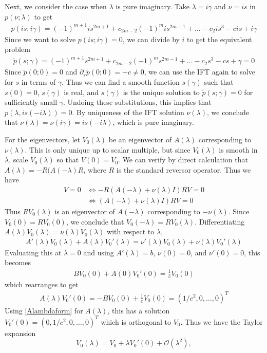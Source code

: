 \documentclass[thesis.tex]{subfiles}
\begin{document}
Next, we consider the case when $\lambda$ is pure imaginary. Take $\lambda = i \gamma$ and $\nu = i s$ in $p(\nu; \lambda)$ to get
\begin{align*}
p(i s; i \gamma) = (-1)^{m+1} i s^{2m+1} + c_{2m-2} (-1)^m i s^{2m-1} + \dots - c_2 i s^3 - c i s + i \gamma
\end{align*}
Since we want to solve $p(i s; i \gamma) = 0$, we can divide by $i$ to get the equivalent problem
\begin{align*}
\tilde{p}(s; \gamma) = (-1)^{m+1} s^{2m+1} + c_{2m-2} (-1)^m s^{2m-1} + \dots - c_2 s^3 - c s + \gamma = 0
\end{align*}
Since $\tilde{p}(0; 0) = 0$ and $\partial_s \tilde{p}(0; 0) = -c \neq 0$, we can use the IFT again to solve for $s$ in terms of $\gamma$. Thus we can find a smooth function $s(\gamma)$ such that $s(0) = 0$, $s(\gamma)$ is real, and $s(\gamma)$ is the unique solution to $\tilde{p}(s; \gamma) = 0$ for sufficiently small $\gamma$. Undoing these substitutions, this implies that $p(\lambda, i s(-i \lambda)) = 0$. By uniqueness of the IFT solution $\nu(\lambda)$, we conclude that $\nu(\lambda) = \nu(i \gamma) = i s(-i \lambda)$, which is pure imaginary.

For the eigenvectors, let $V_0(\lambda)$ be an eigenvector of $A(\lambda)$ corresponding to $\nu(\lambda)$. This is only unique up to scalar multiple, but since $V_0(\lambda)$ is smooth in $\lambda$, scale $V_0(\lambda)$ so that $V(0) = V_0$. We can verify by direct calculation that $A(\lambda) = -R(A(-\lambda)R$, where $R$ is the standard reversor operator. Thus we have
\begin{align*}
[A(\lambda) - \nu(\lambda) I]V = 0 &\iff -R(A(-\lambda) + \nu(\lambda) I)RV = 0 \\
&\iff (A(-\lambda) + \nu(\lambda) I)RV = 0 
\end{align*}
Thus $RV_0(\lambda)$ is an eigenvector of $A(-\lambda)$ corresponding to $-\nu(\lambda)$. Since $V_0(0) = RV_0(0)$, we conclude that $V_0(-\lambda) = R V_0(\lambda)$. Differentiating $A(\lambda)V_0(\lambda) = \nu(\lambda) V_0(\lambda)$ with respect to $\lambda$,
\begin{align*}
A'(\lambda)V_0(\lambda) + A(\lambda)V_0'(\lambda) = \nu'(\lambda)V_0(\lambda) + \nu(\lambda)V_0'(\lambda)
\end{align*}
Evaluating this at $\lambda = 0$ and using $A'(\lambda) = b$, $\nu(0) = 0$, and $\nu'(0) = 0$, this becomes
\begin{align*}
B V_0(0) + A(0)V_0'(0) = \frac{1}{c} V_0(0)
\end{align*}
which rearranges to get
\begin{align*}
A(\lambda)V_0'(0) = -B V_0(0) + \frac{1}{c} V_0(0)
= (1/c^2, 0, \dots, 0)^T
\end{align*}
Using \eqref{Alambdaform} for $A(\lambda)$, this has a solution $V_0'(0) = (0, 1/c^2, 0, \dots, 0)^T$ which is orthogonal to $V_0$. Thus we have the Taylor expansion
\[
V_0(\lambda) = V_0 + \lambda V_0'(0) + \mathcal{O}(\lambda^2),
\]
\end{document}
